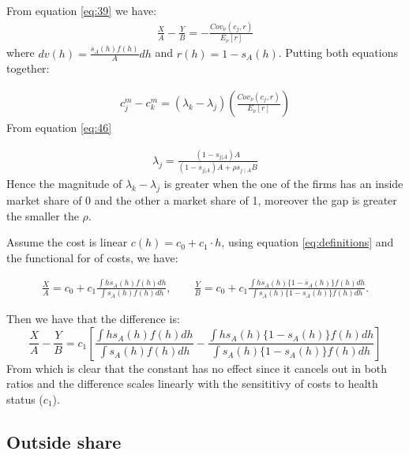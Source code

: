 \documentclass[12pt]{article}
\theoremstyle{plain}
\theoremstyle{plain}
\begin{document}
From equation \ref{eq:39} we have: 
\begin{align}
   \frac{X}{A} -\frac{Y}{B}=  -\frac{Cov_{\nu}(c_j,r)}{E_{\nu}[r]} 
\end{align} 
where $dv(h) = \frac{s_A(h)f(h)}{A}dh$ and $r(h) = 1-s_A(h)$. Putting both equations together: 

 \begin{align} 
    c^m_j -c^m_k = (\lambda_k - \lambda_j)\left(\frac{Cov_{\nu}(c_j,r)}{E_{\nu}[r]}\right)
\end{align}
From equation \ref{eq:46}

\begin{align}
    \lambda_j = \frac{(1-s_{j|A})A}{(1-s_{j|A})A+\rho s_{j\mid A}B} 
\end{align}
Hence the magnitude of $\lambda_k - \lambda_j$ is greater when the one of the firms has an inside market share of 0 and the other a market share of 1, moreover the gap is greater the smaller the $\rho$. 


Assume the cost is linear $c(h) = c_0 + c_1 \cdot h$, using equation \ref{eq:definitions} and the functional for of costs, we have: 

\begin{align}
    \frac{X}{A} = c_0 + c_1 \frac{\int h s_A(h)f(h)dh}{\int s_A(h)f(h)dh}, \qquad \frac{Y}{B} = c_0 + c_1 \frac{\int h s_A(h)\{1-s_A(h)\}f(h)dh}{\int s_A(h)\{1-s_A(h)\}f(h)dh}.
\end{align}

Then we have that the difference is: 
\[
 \frac{X}{A} - \frac{Y}{B} = c_1 \left[ \frac{\int h s_A(h)f(h)dh}{\int s_A(h)f(h)dh} - \frac{\int h s_A(h)\{1-s_A(h)\}f(h)dh}{\int s_A(h)\{1-s_A(h)\}f(h)dh} \right]
\]
From which is clear that the constant has no effect since it cancels out in both ratios and the difference scales linearly with the sensititivy of costs to health status ($c_1$). 

\vspace{2cm}






\subsection{Outside share}\label{sec:appendix4}
\end{document}
